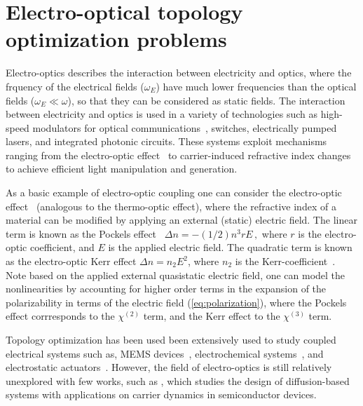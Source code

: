 \chapter{Electro-optical topology optimization problems}
Electro-optics describes the interaction between electricity and optics, where the frquency of the electrical fields ($\omega_E$)
have much lower frequencies than the optical fields ($\omega_E \ll \omega $), so that they can be considered as static fields.
The interaction between electricity and optics is used in a variety of technologies such as high-speed modulators for optical communications~\cite{modu, modu1, modu2, pockels}, switches\cite{eo_switch}, electrically pumped lasers\cite{laser,laser_pic}, and integrated photonic circuits\cite{laser_pic}. 
These systems exploit mechanisms ranging from the electro-optic effect~\cite{eo_effect} to carrier-induced refractive index
 changes \cite{c_i_n} to achieve efficient light manipulation and generation.

As a basic example of electro-optic coupling one can consider the electro-optic effect~\cite{eo_effect} (analogous to the thermo-optic effect),
where the refractive index of a material can be modified by applying an external (static) electric field. The linear term is known as the
Pockels effect~\cite{pockels} $
    \Delta n = -(1/2) n^3 r E\,,$
where $r$ is the electro-optic coefficient, and $E$ is the applied electric field. The quadratic term 
is known as the electro-optic Kerr effect $\Delta n = n_2 E^2$, where $n_2$ is the Kerr-coefficient~\cite{phot_crys}. Note based on the applied external
quasistatic electric field, one can model the nonlinearities by accounting for higher order terms in the expansion of the polarizability
in terms of the electric field (\eqref{eq:polarization}), where the Pockels effect corrresponds to the $\chi^{(2)}$ term, and the Kerr effect to the $\chi^{(3)}$ term.

Topology optimization has been used been extensively used to study coupled electrical systems
such as, MEMS devices~\cite{MEMS_multi}, electrochemical systems~\cite{electrode}, and electrostatic actuators~\cite{electrostatic_act}. However, the field of electro-optics is
still relatively unexplored with few works, such as \cite{g_heat}, which studies the design of diffusion-based systems with applications on
carrier dynamics in semiconductor devices.

